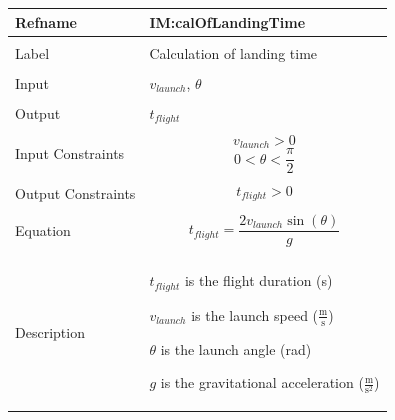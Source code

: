 \documentclass[12pt]{article}
\begin{document}
\noindent \begin{minipage}{\textwidth}
          \begin{tabular}{>{\raggedright}p{}>{\raggedright\arraybackslash}p{}}
          \toprule \textbf{Refname} & \textbf{IM:calOfLandingTime}
          \label{IM:calOfLandingTime}
          \\ \midrule \\
          Label & Calculation of landing time
          \\ \midrule \\
          Input & ${v_{launch}}$, $θ$
          \\ \midrule \\
          Output & ${t_{flight}}$
          \\ \midrule \\
          Input Constraints & \begin{displaymath}
                              {v_{launch}}>0
                              \end{displaymath}
                              \begin{displaymath}
                              0<θ<\frac{π}{2}
                              \end{displaymath}
          \\ \midrule \\
          Output Constraints & \begin{displaymath}
                               {t_{flight}}>0
                               \end{displaymath}
          \\ \midrule \\
          Equation & \begin{displaymath}
                     {t_{flight}}=\frac{2 {v_{launch}} \sin\left(θ\right)}{g}
                     \end{displaymath}
          \\ \midrule \\
          Description & \begin{symbDescription}
                        \item{${t_{flight}}$ is the flight duration (s)}
                        \item{${v_{launch}}$ is the launch speed ($\frac{\text{m}}{\text{s}}$)}
                        \item{$θ$ is the launch angle (rad)}
                        \item{$g$ is the gravitational acceleration ($\frac{\text{m}}{\text{s}^{2}}$)}

\end{symbDescription}
\end{tabular}
\end{minipage}
\end{document}
